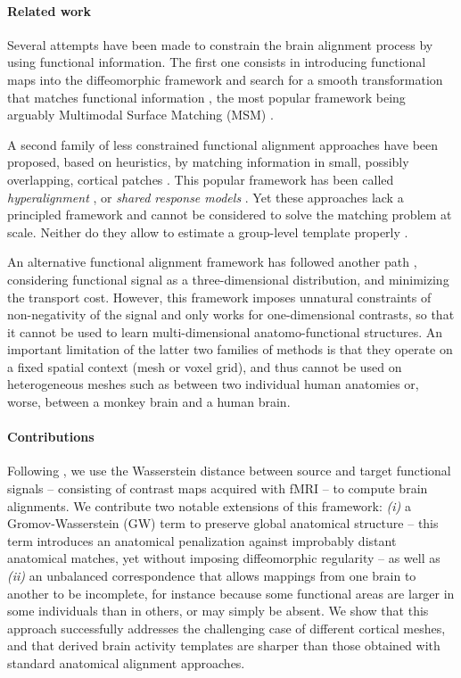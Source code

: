 \paragraph{Related work}
%
Several attempts have been made to constrain the brain alignment process by using
functional information. The first one consists in introducing functional maps into
the diffeomorphic framework and search for a smooth transformation that matches
functional information \citep{sabuncu_function-based_2010,yeo_spherical_2010,robinson_msm_2014},
the most popular framework being arguably Multimodal Surface Matching (MSM)
\citep{robinson_msm_2014,Glasser2016-ha}.

A second family of less constrained functional alignment approaches have been proposed,
based on heuristics, by matching information in small, possibly overlapping,
cortical patches \citep{haxby_common_2011,Tavor2016-rl,bazeille_empirical_2021}.
%
This popular framework has been called \emph{hyperalignment}
\citep{haxby_common_2011,guntupalli_model_2016}, or \emph{shared response models} \citep{Chen2015}.
%
Yet these approaches lack a principled framework and cannot be considered to solve
the matching problem at scale. Neither do they allow to estimate %
a group-level template properly \citep{alwasity2020}.

An alternative functional alignment framework has followed another path \citep{gramfort2015},
considering functional signal as a three-dimensional distribution, and minimizing the transport cost.
However, this framework imposes unnatural constraints of non-negativity of the signal and %
only works for one-dimensional contrasts, so that it cannot be used to learn
multi-dimensional anatomo-functional structures.
%
An important limitation of the latter two families of methods is that they operate on
a fixed spatial context (mesh or voxel grid), and thus cannot be used on heterogeneous meshes
such as between two individual human anatomies or, worse, between a monkey brain
and a human brain.


\paragraph{Contributions}

Following \citep{bazeille_local_2019}, we use the Wasserstein distance between source and
target functional signals -- consisting of contrast maps acquired with fMRI --
to compute brain alignments. We contribute two notable extensions of this framework:
\textit{(i)} a Gromov-Wasserstein (GW) term to preserve global anatomical structure --
this term introduces an anatomical penalization against improbably distant anatomical matches,
yet without imposing diffeomorphic regularity -- as well as
\textit{(ii)} an unbalanced correspondence that allows mappings from one brain to another
to be incomplete, for instance because some functional areas are larger in some individuals
than in others, or may simply be absent. We show that this approach successfully addresses
the challenging case of different cortical meshes, and that derived brain activity templates
are sharper than those obtained with standard anatomical alignment approaches.

